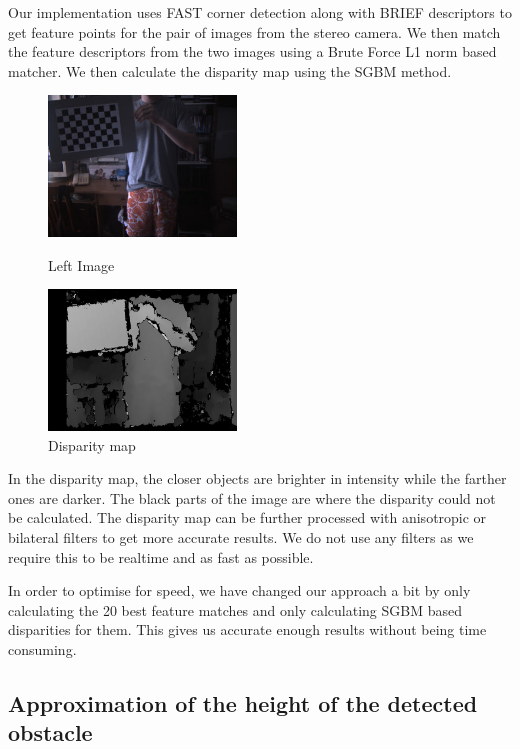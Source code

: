 \documentclass[11pt]{report}
\begin{document}
Our implementation uses FAST corner detection\cite{rosten_2006_machine} along with BRIEF descriptors to get feature points for the pair of images from the stereo camera. We then match the feature descriptors from the two images using a Brute Force L1 norm based matcher. We then calculate the disparity map using the SGBM method. 



\begin{figure}
\centering
\parbox{5cm}{
\includegraphics[width=5cm]{left.jpg}
\caption{Left Image}
\label{fig:2figsA}}
\qquad
\begin{minipage}{5cm}
\includegraphics[width=5cm]{disp.jpg}
\caption{Disparity map}
\label{fig:2figsB}
\end{minipage}
\end{figure}




In the disparity map, the closer objects are brighter in intensity while the farther ones are darker. The black parts of the image are where the disparity could not be calculated. The disparity map can be further processed with anisotropic or bilateral filters to get more accurate results. We do not use any filters as we require this to be realtime and as fast as possible. 

In order to optimise for speed, we have changed our approach a bit by only calculating the 20 best feature matches and only calculating SGBM based disparities for them. This gives us accurate enough results without being time consuming. 


\subsection{Approximation of the height of the detected obstacle}
\end{document}
